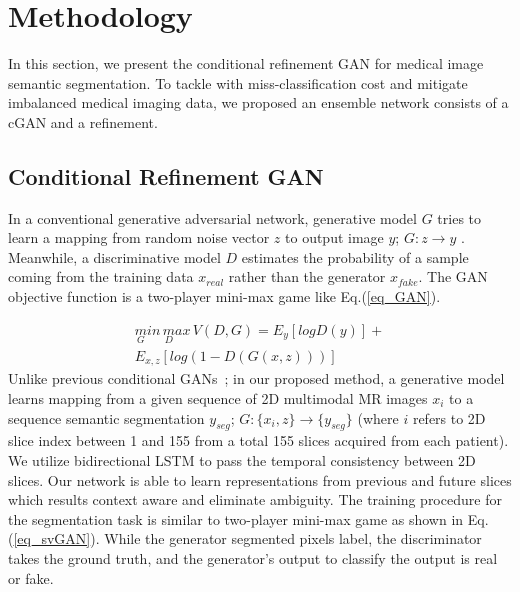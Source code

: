 \documentclass[10pt,twocolumn,letterpaper]{article}
\begin{document}
\section{Methodology}\label{methodology}
In this section, we present the conditional refinement GAN for medical image semantic segmentation. To tackle with miss-classification cost and mitigate imbalanced medical imaging data, we proposed an ensemble network consists of a cGAN and a refinement.

\subsection{Conditional Refinement GAN}\label{CRGAN}
In a conventional generative adversarial network, generative model $G$ tries to learn a mapping from random noise vector $z$ to output image $y$; $G: z \rightarrow y$ .
Meanwhile, a discriminative model $D$ estimates the probability of a sample coming from the training data $x_{real}$ rather than the generator $x_{fake}$.
The GAN objective function is a two-player mini-max game like Eq.(\ref{eq_GAN}).

\begin{equation} \label{eq_GAN}
\begin{split}
 \underset{G} min \,  \underset{D } max \, V(D, G)
   = E_{y} [log D(y)] + \\
     E_{x,z} [log (1-D(G(x,z)))] 
\end{split}
\end{equation}%
Unlike previous conditional GANs~\cite{MirzaO14,Phillipimagetoimage2017,XueXZLH17,Moeskops2017,KohlBSYHHRM17}; in our proposed method, a generative model learns mapping from a given sequence of 2D multimodal MR images $x_i$ to a sequence semantic segmentation $y_{seg}$; $G : \{x_i,z\} \rightarrow \{y_{seg}\}$ (where $i$ refers to 2D slice index between 1 and 155 from a total 155 slices acquired from each patient).
We utilize bidirectional LSTM to pass the temporal consistency between 2D slices. Our network is able to learn representations from previous and future slices which results context aware and eliminate ambiguity. 
The training procedure for the segmentation task is similar to two-player mini-max game as shown in Eq.(\ref{eq_svGAN}).
While the generator segmented pixels label, the discriminator takes the ground truth, and the generator's output to classify the output is real or fake.
\end{document}
